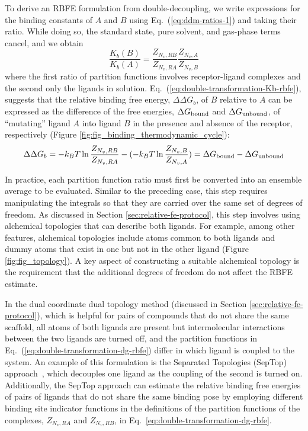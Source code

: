 \documentclass[9pt,bestpractices]{livecoms}
\begin{document}
To derive an RBFE formulation from double-decoupling, we write expressions for the binding constants of $A$ and $B$ using Eq.~(\ref{eq:ddm-ratios-1}) and taking their ratio. While doing so, the standard state, pure solvent, and gas-phase terms cancel, and we obtain
\begin{equation}\label{eq:double-transformation-Kb-rbfe}
\frac{K_b(B)}{K_b(A)} = \frac{Z_{N_v,RB}}{Z_{N_v,RA}} \frac{Z_{N_v,A}}{Z_{N_v,B}}
\end{equation}
where the first ratio of partition functions involves receptor-ligand complexes and the second only the ligands in solution. Eq.~(\ref{eq:double-transformation-Kb-rbfe}), suggests that the relative binding free energy, $\Delta \Delta G_b$, of $B$ relative to $A$ can be expressed as the difference of the free energies, $\Delta G_{\rm bound}$ and $\Delta G_{\rm unbound}$, of ``mutating'' ligand $A$ into ligand $B$ in the presence and absence of the receptor, respectively (Figure \ref{fig:fig_binding_thermodynamic_cycle}):~\cite{tembre1984ligandreceptor,gilson1997statisticalthermodynamic,mobley2012perspective,cournia2017relative,jiang2019computing, Lee_JChemTheoryComput_2020_v16_p5512}
\begin{equation}\label{eq:double-transformation-dg-rbfe}
\Delta \Delta G_b = -k_B T \ln \frac{Z_{N_v,RB}}{Z_{N_v,RA}} - (-k_B T \ln \frac{Z_{N_v,B}}{Z_{N_v,A}}) = \Delta G_{\rm bound} - \Delta G_{\rm unbound}
\end{equation}

In practice, each partition function ratio must first be converted into an ensemble average to be evaluated. Similar to the preceding case, this step requires manipulating the integrals so that they are carried over the same set of degrees of freedom. As discussed in Section \ref{sec:relative-fe-protocol}, this step involves using alchemical topologies that can describe both ligands. For example, among other features, alchemical topologies include atoms common to both ligands and dummy atoms that exist in one but not in the other ligand (Figure \ref{fig:fig_topology}). A key aspect of constructing a suitable alchemical topology is the requirement that the additional degrees of freedom do not affect the RBFE estimate.

In the dual coordinate dual topology method (discussed in Section \ref{sec:relative-fe-protocol}), which is helpful for pairs of compounds that do not share the same scaffold, all atoms of both ligands are present but intermolecular interactions between the two ligands are turned off, and the partition functions in Eq.~(\ref{eq:double-transformation-dg-rbfe}) differ in which ligand is coupled to the system. An example of this formulation is the Separated Topologies (SepTop) approach~\cite{rocklin2013separated,baumann2023broadening}, which decouples one ligand as the coupling of the second is turned on. Additionally, the SepTop approach can estimate the relative binding free energies of pairs of ligands that do not share the same binding pose by employing different binding site indicator functions in the definitions of the partition functions of the complexes, $Z_{N_v,RA}$ and $Z_{N_v,RB}$, in Eq.~\ref{eq:double-transformation-dg-rbfe}.
\end{document}
